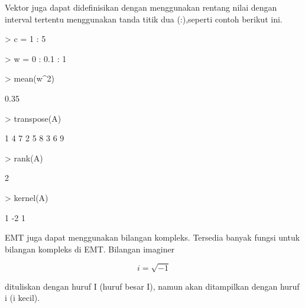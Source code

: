 \documentclass{report}
\begin{document}
\begin{eulernotebook}
\begin{eulercomment}
\begin{eulercomment}
\begin{eulercomment}
Vektor juga dapat didefinisikan dengan menggunakan rentang nilai
dengan interval tertentu menggunakan tanda titik dua (:),seperti
contoh berikut ini.
\end{eulercomment}
\begin{eulerprompt}
> c = 1 : 5
\end{eulerprompt}
\begin{euleroutput}
  [1,  2,  3,  4,  5]
\end{euleroutput}
\begin{eulerprompt}
> w = 0 : 0.1 : 1
\end{eulerprompt}
\begin{euleroutput}
  [0,  0.1,  0.2,  0.3,  0.4,  0.5,  0.6,  0.7,  0.8,  0.9,  1]
\end{euleroutput}
\begin{eulerprompt}
> mean(w^2)
\end{eulerprompt}
\begin{euleroutput}
  0.35
\end{euleroutput}
\begin{eulerprompt}
> transpose(A)
\end{eulerprompt}
\begin{euleroutput}
              1             4             7 
              2             5             8 
              3             6             9 
\end{euleroutput}
\begin{eulerprompt}
> rank(A)
\end{eulerprompt}
\begin{euleroutput}
  2
\end{euleroutput}
\begin{eulerprompt}
> kernel(A)
\end{eulerprompt}
\begin{euleroutput}
              1 
             -2 
              1 
\end{euleroutput}
\begin{eulercomment}
EMT juga dapat menggunakan bilangan kompleks. Tersedia banyak fungsi
untuk bilangan kompleks di EMT. Bilangan imaginer

\end{eulercomment}
\begin{eulerformula}
\[
i = \sqrt{-1}
\]
\end{eulerformula}
\begin{eulercomment}
dituliskan dengan huruf I (huruf besar I), namun akan ditampilkan
dengan huruf i (i kecil).


\end{eulercomment}
\end{eulercomment}
\end{eulercomment}
\end{eulernotebook}
\end{document}
